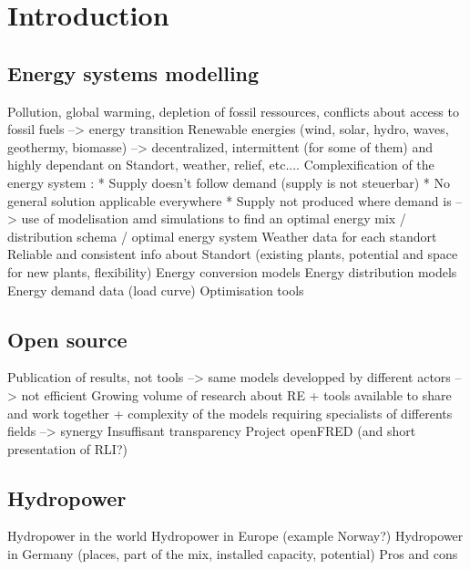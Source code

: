 \chapter{Introduction}
\label{chap:introduction}

\section{Energy systems modelling}
Pollution, global warming, depletion of fossil ressources, conflicts about access to fossil fuels --> energy transition \newline
Renewable energies (wind, solar, hydro, waves, geothermy, biomasse) --> decentralized, intermittent (for some of them) and highly dependant on Standort, weather, relief, etc.... \newline
Complexification of the energy system :\newline
* Supply doesn't follow demand (supply is not steuerbar)\newline
* No general solution applicable everywhere\newline
* Supply not produced where demand is\newline
--> use of modelisation amd simulations to find an optimal energy mix / distribution schema / optimal energy system\newline
Weather data for each standort\newline
Reliable and consistent info about Standort (existing plants, potential and space for new plants, flexibility)\newline
Energy conversion models\newline
Energy distribution models\newline
Energy demand data (load curve)\newline
Optimisation tools\newline

\section{Open source}
Publication of results, not tools --> same models developped by different actors --> not efficient  \newline
Growing volume of research about RE + tools available to share and work together + complexity of the models requiring specialists of differents fields --> synergy \newline
Insuffisant transparency \newline
Project openFRED (and short presentation of RLI?)\newline

\section{Hydropower}
Hydropower in the world \newline
Hydropower in Europe (example Norway?) \newline
Hydropower in Germany (places, part of the mix, installed capacity, potential) \newline
Pros and cons \newline


